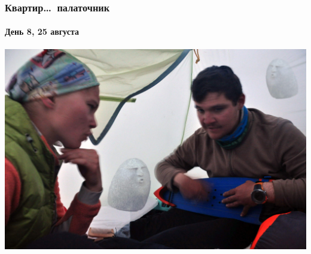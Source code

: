 \begin{frame}
	\frametitle{Квартир\dots~палаточник}
	\framesubtitle{День 8, 25 августа}
	\centering
	\includegraphics[width=\textwidth]{../pics/DSC_0187}			
\end{frame}